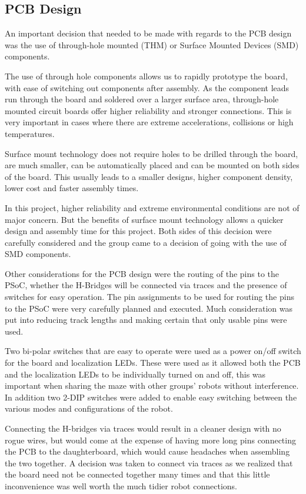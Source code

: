 \documentclass{article}
\begin{document}
\subsection{PCB Design}

An important decision that needed to be made with regards to the PCB design was the use of through-hole mounted (THM) or Surface Mounted Devices (SMD) components.

The use of through hole components allows us to rapidly prototype the board, with ease of switching out components after assembly. As the component leads run through the board and soldered over a larger surface area, through-hole mounted circuit boards offer higher reliability and stronger connections. This is very important in cases where there are extreme accelerations, collisions or high temperatures.

Surface mount technology does not require holes to be drilled through the board, are much smaller, can be automatically placed and can be mounted on both sides of the board. This usually leads to a smaller designs, higher component density, lower cost and faster assembly times. 

In this project, higher reliability and extreme environmental conditions are not of major concern. But the benefits of surface mount technology allows a quicker design and assembly time for this project. Both sides of this decision were carefully considered and the group came to a decision of going with the use of SMD components.

Other considerations for the PCB design were the routing of the pins to the PSoC, whether the H-Bridges will be connected via traces and the presence of switches for easy operation. The pin assignments to be used for routing the pins to the PSoC were very carefully planned and executed. Much consideration was put into reducing track lengths and making certain that only usable pins were used.

Two bi-polar switches that are easy to operate were used as a power on/off switch for the board and localization LEDs. These were used as it allowed both the PCB and the localization LEDs to be individually turned on and off, this was important when sharing the maze with other groups' robots without interference. In addition two 2-DIP switches were added to enable easy switching between the various modes and configurations of the robot.

Connecting the H-bridges via traces would result in a cleaner design with no rogue wires, but would come at the expense of having more long pins connecting the PCB to the daughterboard, which would cause headaches when assembling the two together. A decision was taken to connect via traces as we realized that the board need not be connected together many times and that this little inconvenience was well worth the much tidier robot connections.
\end{document}
